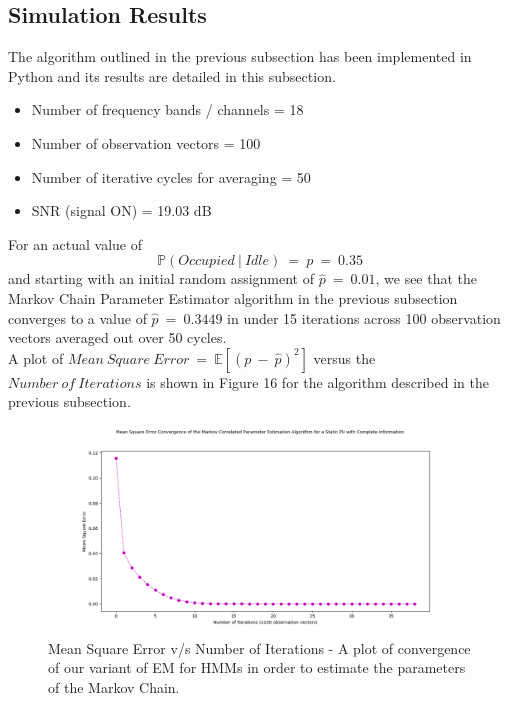 \documentclass[12pt, draftcls, onecolumn]{IEEEtran}
\begin{document}
\subsection{Simulation Results}
The algorithm outlined in the previous subsection has been implemented in Python and its results are detailed in this subsection.
\begin{itemize}
    \item Number of frequency bands / channels = 18
    \item Number of observation vectors = 100
    \item Number of iterative cycles for averaging = 50
    \item SNR (signal ON) = 19.03 dB
\end{itemize}
For an actual value of
\[\mathbb{P}(Occupied\ |\ Idle)\ =\ p\ =\ 0.35\]
and starting with an initial random assignment of $\hat{p}\ =\ 0.01$, we see that the Markov Chain Parameter Estimator algorithm in the previous subsection converges to a value of $\hat{p}\ =\ 0.3449$ in under 15 iterations across 100 observation vectors averaged out over 50 cycles.
\\A plot of $Mean\ Square\ Error\ =\ \mathbb{E}[(p\ -\ \hat{p})^2]$ versus the $Number\ of\ Iterations$ is shown in Figure 16 for the algorithm described in the previous subsection.
\begin{figure}[t]
\includegraphics[width=1.0\textwidth]{Mean_Square_Error_vs_Iterations.png}
\caption{Mean Square Error v/s Number of Iterations - A plot of convergence of our variant of EM for HMMs in order to estimate the parameters of the Markov Chain.}
\label{fig:mesh16}
\centering
\end{figure}
\end{document}
